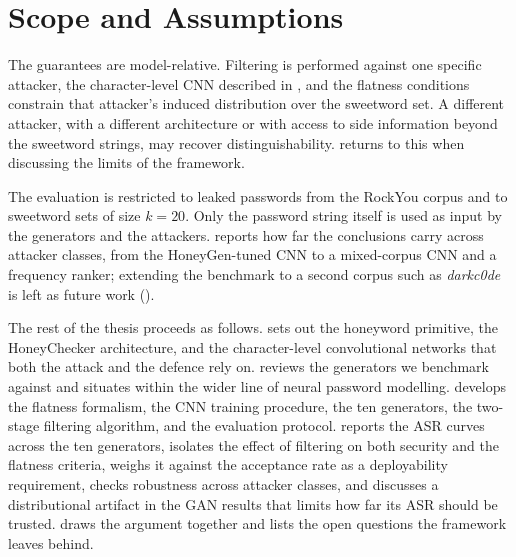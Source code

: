 \section{Scope and Assumptions}

The guarantees are model-relative. Filtering is performed against one
specific attacker, the character-level CNN described in
, and the flatness conditions constrain that attacker's
induced distribution over the sweetword set. A different attacker, with
a different architecture or with access to side information beyond the
sweetword strings, may recover distinguishability. 
returns to this when discussing the limits of the framework.

The evaluation is restricted to leaked passwords from the RockYou corpus
and to sweetword sets of size $k=20$. Only the password string itself is
used as input by the generators and the attackers. 
reports how far the conclusions carry across attacker classes, from the
HoneyGen-tuned CNN to a mixed-corpus CNN and a frequency ranker;
extending the benchmark to a second corpus such as \emph{darkc0de} is
left as future work ().

The rest of the thesis proceeds as follows.  sets
out the honeyword primitive, the HoneyChecker architecture, and the
character-level convolutional networks that both the attack and the
defence rely on.  reviews the generators we benchmark
against and situates \textcite{dani2024passfilter} within the wider line
of neural password modelling.  develops the flatness
formalism, the CNN training procedure, the ten generators, the two-stage
filtering algorithm, and the evaluation protocol. 
reports the ASR curves across the ten generators, isolates the effect of
filtering on both security and the flatness criteria, weighs it against
the acceptance rate as a deployability requirement, checks robustness
across attacker classes, and discusses a distributional artifact in the
GAN results that limits how far its ASR should be trusted.
 draws the argument together and lists the open
questions the framework leaves behind.